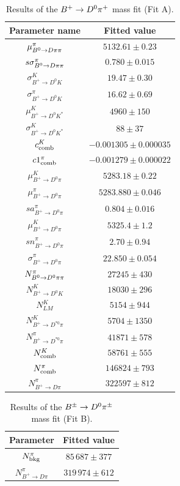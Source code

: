 \begin{table}[htbp]
  \begin{center}
    \caption{Results of the $B^+\rightarrow D^0\pi^+$ mass fit (Fit A).}
    \begin{tabular}{cc}
\toprule
   Parameter name & Fitted value \\
\midrule
$\mu^{\pi}_{B^0\rightarrow D\pi\pi}$ & $5132.61\pm0.23$ \\
$s\sigma^{\pi}_{B^0\rightarrow D\pi\pi}$ & $0.780\pm0.015$ \\
$\sigma^{K}_{B^{+}\to D^{0}K}$ & $19.47\pm0.30$ \\
$\sigma^{\pi}_{B^{+}\to D^{0}K}$ & $16.62\pm0.69$ \\
$\mu^{K}_{B^{+}\to D^{0}K^{*}}$ & $4960\pm150$ \\
$\sigma^{K}_{B^{+}\to D^{0}K^{*}}$ & $88\pm37$ \\
$c^{K}_{\rm comb}$ & $-0.001305\pm0.000035$ \\
$c1^{\pi}_{\rm comb}$ & $-0.001279\pm0.000022$ \\
$\mu^{K}_{B^{+}\to D^{0}\pi}$ & $5283.18\pm0.22$ \\
$\mu^{\pi}_{B^{+}\to D^{0}\pi}$ & $5283.880\pm0.046$ \\
$sa^{\pi}_{B^{+}\to D^{0}\pi}$ & $0.804\pm0.016$ \\
$\mu^{K}_{B^{+}\to D^{0}\pi}$ & $5325.4\pm1.2$ \\
$sn^{\pi}_{B^{+}\to D^{0}\pi}$ & $2.70\pm0.94$ \\
$\sigma^{\pi}_{B^{+}\to D^{0}\pi}$ & $22.850\pm0.054$ \\
$N^{\pi}_{B^0\rightarrow D^{0}\pi\pi}$ & $27245\pm430$ \\
$N^{K}_{B^{+}\to D^{0}K}$ & $18030\pm296$ \\
$N^{K}_{LM}$ & $5154\pm944$ \\
$N^{K}_{B^{+}\to D^{*0}\pi}$ & $5704\pm1350$ \\
$N^{\pi}_{B^{+}\to D^{*0}\pi}$ & $41871\pm578$ \\
$N^{K}_{\rm comb}$ & $58761\pm555$ \\
$N^{\pi}_{\rm comb}$ & $146824\pm793$ \\
$N^{\pi}_{B^{+}\to D\pi}$ & $322597\pm812$ \\
\bottomrule
    \end{tabular}
    \label{tab:OSmassFitA}
  \end{center}
\end{table}

\begin{table}[htbp]
  \begin{center}
    \caption{Results of the $B^\pm\rightarrow D^0\pi^\pm$ mass fit (Fit B).}
    \begin{tabular}{cc}
      \toprule
    Parameter & Fitted value \\
    \midrule
    $N^{\pi}_{\rm bkg}$ & $85\,687\pm377$ \\
    $N^{\pi}_{B^{+}\to D\pi}$ & $319\,974\pm612$ \\
    \bottomrule
    \end{tabular}
    \label{tab:OSmassFitB}
  \end{center}
\end{table}

